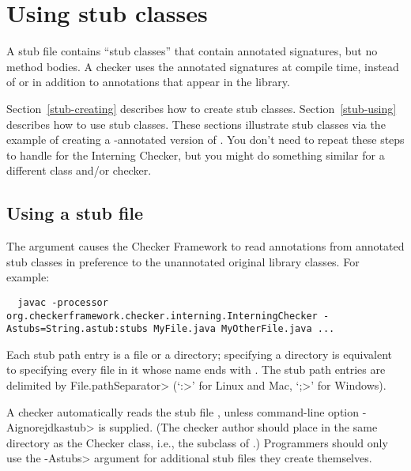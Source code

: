 \section{Using stub classes\label{stub}\label{stub-creating-and-using}}

A stub file contains ``stub classes'' that contain annotated signatures,
but no method bodies.  A
checker uses the annotated signatures at compile time, instead of or in
addition to annotations that appear in the library.

Section~\ref{stub-creating} describes how to create stub classes.
Section~\ref{stub-using} describes how to use stub classes.
These sections illustrate stub classes via the example of creating a -annotated
version of .  You don't need to repeat these steps
to handle  for the Interning Checker,
but you might do something similar for a different class and/or checker.



\subsection{Using a stub file\label{stub-using}}

The  argument causes the Checker Framework to read
annotations from annotated stub classes in preference to the unannotated
original library classes.  For example:

\begin{smaller}
\begin{Verbatim}
  javac -processor org.checkerframework.checker.interning.InterningChecker -Astubs=String.astub:stubs MyFile.java MyOtherFile.java ...
\end{Verbatim}
\end{smaller}

Each stub path entry is a file or a directory; specifying a directory is
equivalent to specifying every file in it whose name ends with
.  The stub path entries are delimited by
\<File.pathSeparator> (`\<:>' for Linux and Mac, `\<;>' for Windows).

A checker automatically reads the stub file , unless
command-line option \<-Aignorejdkastub> is supplied.  (The checker
author should place  in the same directory as the Checker class, i.e.,
the subclass of .)  Programmers should only use the
\<-Astubs> argument for additional stub files they create themselves.

